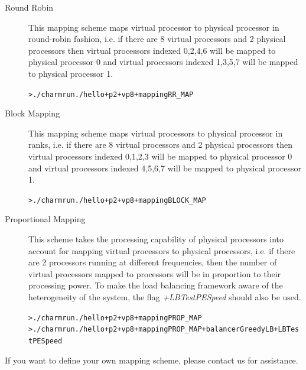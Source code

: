 \documentclass[10pt]{article}
\begin{document}
\begin{description}

\item[Round Robin]
                                                                                
This mapping scheme maps virtual processor to physical processor in round-robin
fashion, i.e. if there are 8 virtual processors and 2 physical processors then
virtual processors indexed 0,2,4,6 will be mapped to physical processor 0 and 
virtual processors indexed 1,3,5,7 will be mapped to physical processor 1. 

\begin{alltt}
> ./charmrun ./hello +p2 +vp8 +mapping RR\_MAP
\end{alltt}
                                                                                
\item[Block Mapping]
                                                                                
This mapping scheme maps virtual processors to physical processor in ranks,
i.e. if there are 8 virtual processors and 2 physical processors then virtual
processors indexed 0,1,2,3 will be mapped to physical processor 0 and virtual
processors indexed 4,5,6,7 will be mapped to physical processor 1.

\begin{alltt}
> ./charmrun ./hello +p2 +vp8 +mapping BLOCK\_MAP
\end{alltt}

\item[Proportional Mapping]

This scheme takes the processing capability of physical processors into account
for mapping virtual processors to physical processors, i.e. if there are 2
processors running at different frequencies, then the number of virtual processors
mapped to processors will be in proportion to their processing power. To make
the load balancing framework aware of the heterogeneity of the system, the flag
\emph{+LBTestPESpeed} should also be used.

\begin{alltt}
> ./charmrun ./hello +p2 +vp8 +mapping PROP\_MAP
> ./charmrun ./hello +p2 +vp8 +mapping PROP\_MAP +balancer GreedyLB +LBTestPESpeed
\end{alltt}

\end{description}

If you want to define your own mapping scheme, please contact us for assistance.
\end{document}
